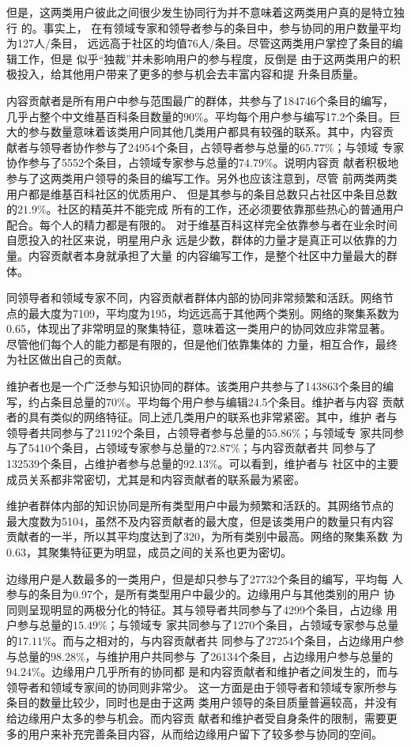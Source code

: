 但是，这两类用户彼此之间很少发生协同行为并不意味着这两类用户真的是特立独行
的。事实上，
在有领域专家和领导者参与的条目中，参与协同的用户数量平均为127人/条目，
远远高于社区的均值76人/条目。尽管这两类用户掌控了条目的编辑工作，但是
似乎“独裁”并未影响用户的参与程度，反倒是
由于这两类用户的积极投入，给其他用户带来了更多的参与机会去丰富内容和提
升条目质量。

内容贡献者是所有用户中参与范围最广的群体，共参与了184746个条目的编写，
几乎占整个中文维基百科条目数量的$90\%$。平均每个用户参与编写17.2个条目。巨
大的参与数量意味着该类用户同其他几类用户都具有较强的联系。其中，内容贡
献者与领导者协作参与了24954个条目，占领导者参与总量的$65.77\%$；与领域
专家协作参与了5552个条目，占领域专家参与总量的$74.79\%$。说明内容贡
献者积极地参与了这两类用户领导的条目的编写工作。另外也应该注意到，尽管
前两类两类用户都是维基百科社区的优质用户、
但是其参与的条目总数只占社区中条目总数的$21.9\%$。社区的精英并不能完成
所有的工作，还必须要依靠那些热心的普通用户配合。每个人的精力都是有限的。
对于维基百科这样完全依靠参与者在业余时间自愿投入的社区来说，明星用户永
远是少数，群体的力量才是真正可以依靠的力量。内容贡献者本身就承担了大量
的内容编写工作，是整个社区中力量最大的群体。

同领导者和领域专家不同，内容贡献者群体内部的协同非常频繁和活跃。网络节
点的最大度为7109，平均度为195，均远远高于其他两个类别。网络的聚集系数为
0.65，体现出了非常明显的聚集特征，意味着这一类用户的协同效应非常显著。
尽管他们每个人的能力都是有限的，但是他们依靠集体的
力量，相互合作，最终为社区做出自己的贡献。

维护者也是一个广泛参与知识协同的群体。该类用户共参与了143863个条目的编
写，约占条目总量的$70\%$。平均每个用户参与编辑24.5个条目。维护者与内容
贡献者的具有类似的网络特征。同上述几类用户的联系也非常紧密。其中，维护
者与领导者共同参与了21192个条目，占领导者参与总量的$55.86\%$；与领域专
家共同参与了5410个条目，占领域专家参与总量的$72.87\%$；与内容贡献者共
同参与了132539个条目，占维护者参与总量的$92.13\%$。可以看到，维护者与
社区中的主要成员关系都非常密切，尤其是和内容贡献者的联系最为紧密。

维护者群体内部的知识协同是所有类型用户中最为频繁和活跃的。其网络节点的
最大度数为5104，虽然不及内容贡献者的最大度，但是该类用户的数量只有内容
贡献者的一半，所以其平均度达到了320，为所有类别中最高。网络的聚集系数
为0.63，其聚集特征更为明显，成员之间的关系也更为密切。

边缘用户是人数最多的一类用户，但是却只参与了27732个条目的编写，平均每
人参与的条目为0.97个，是所有类型用户中最少的。边缘用户与其他类别的用户
协同则呈现明显的两极分化的特征。其与领导者共同参与了4299个条目，占边缘
用户参与总量的$15.49\%$；与领域专
家共同参与了1270个条目，占领域专家参与总量的$17.11\%$。而与之相对的，与内容贡献者共
同参与了27254个条目，占边缘用户参与总量的$98.28\%$，与维护用户共同参与
了26134个条目，占边缘用户参与总量的$94.24\%$。边缘用户几乎所有的协同都
是和内容贡献者和维护者之间发生的，而与领导者和领域专家间的协同则非常少。
这一方面是由于领导者和领域专家所参与条目的数量比较少，同时也是由于这两
类用户领导的条目质量普遍较高，并没有给边缘用户太多的参与机会。而内容贡
献者和维护者受自身条件的限制，需要更多的用户来补充完善条目内容，从而给边缘用户留下了较多参与协同的空间。

